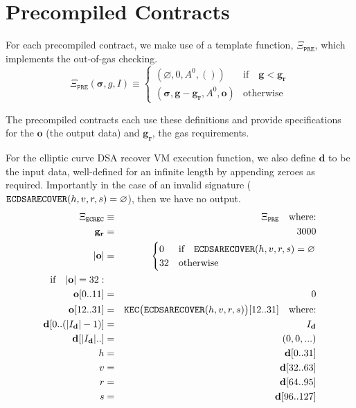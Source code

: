 \documentclass[9pt,oneside]{amsart}
\begin{document}
\section{Precompiled Contracts}\label{app:precompiled}

For each precompiled contract, we make use of a template function, $\Xi_{\mathtt{PRE}}$, which implements the out-of-gas checking.
\begin{equation}
\Xi_{\mathtt{PRE}}(\boldsymbol{\sigma}, g, I) \equiv \begin{cases}
(\varnothing, 0, A^0, ()) & \text{if} \quad \mathbf{g} < \mathbf{g}_\mathbf{r} \\
(\boldsymbol\sigma, \mathbf{g} - \mathbf{g}_\mathbf{r}, A^0, \mathbf{o}) & \text{otherwise}\end{cases}
\end{equation}

The precompiled contracts each use these definitions and provide specifications for the $\mathbf{o}$ (the output data) and $\mathbf{g}_\mathbf{r}$, the gas requirements.

For the elliptic curve DSA recover VM execution function, we also define $\mathbf{d}$ to be the input data, well-defined for an infinite length by appending zeroes as required. Importantly in the case of an invalid signature ($\mathtt{\tiny ECDSARECOVER}(h, v, r, s) = \varnothing$), then we have no output.
\begin{eqnarray}
\Xi_{\mathtt{ECREC}} &\equiv& \Xi_{\mathtt{PRE}} \quad \text{where:} \\
\mathbf{g}_\mathbf{r} &=& 3000\\
|\mathbf{o}| &=& \begin{cases} 0 & \text{if} \quad \mathtt{\tiny ECDSARECOVER}(h, v, r, s) = \varnothing\\ 32 & \text{otherwise} \end{cases}\\
\text{if} \quad |\mathbf{o}| = 32: &&\\
\mathbf{o}[0..11] &=& 0 \\
\mathbf{o}[12..31] &=& \mathtt{\tiny KEC}\big(\mathtt{\tiny ECDSARECOVER}(h, v, r, s)\big)[12..31] \quad \text{where:}\\
\mathbf{d}[0..(|I_\mathbf{d}|-1)] &=& I_\mathbf{d}\\
\mathbf{d}[|I_\mathbf{d}|..] &=& (0, 0, ...) \\
h &=& \mathbf{d}[0..31]\\
v &=& \mathbf{d}[32..63]\\
r &=& \mathbf{d}[64..95]\\
s &=& \mathbf{d}[96..127]
\end{eqnarray}
\end{document}
